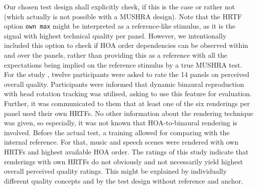 \documentclass[conference]{IEEEtran}
\def\NewL{\\\noindent\hspace*{5mm}}
\begin{document}
%
Our chosen test design shall explicitly check, if this is the case or rather not (which actually is not possible with a MUSHRA design).
%
Note that the HRTF option \texttt{own max} might be interpreted as a reference-like stimulus, as it is the signal with highest technical quality per panel.
%
However, we intentionally included this option to check if HOA order dependencies can be observed within and over the panels, rather than providing this as a reference with all the expectations being implied on the reference stimulus by a true MUSHRA test.
%
\NewL For the study \cite{Schultz2023_Acta}, twelve participants were asked to rate the 14 panels on perceived overall quality.
%
Participants were informed that dynamic binaural reproduction with head rotation tracking was utilised, asking to use this feature for evaluation.
%
Further, it was communicated to them that at least one of the six renderings per panel used their own HRTFs.
%
No other information about the rendering technique was given, so especially, it was not known that HOA-to-binaural rendering is involved.
%
Before the actual test, a training allowed for comparing with the internal reference.
%
For that, music and speech scenes were rendered with own HRTFs and highest available HOA order.
%
The ratings of this study indicate that renderings with own HRTFs do not obviously and not necessarily yield highest overall perceived quality ratings.
%
This might be explained by individually different quality concepts and by the test design without reference and anchor.
\end{document}

